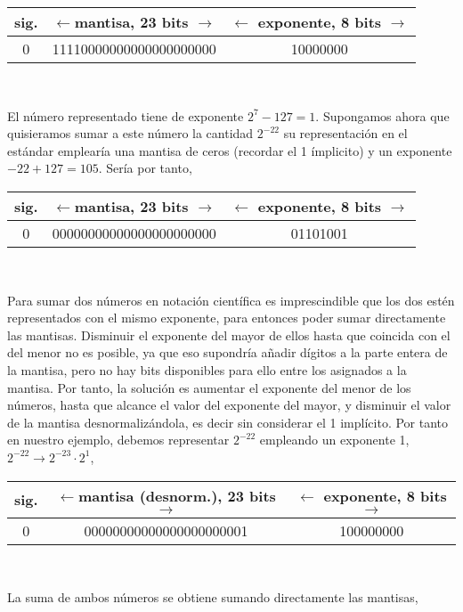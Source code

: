\begin{tabular}{|c||c||c|}
\hline
sig.&$\leftarrow$mantisa, 23 bits $\rightarrow$&$\leftarrow$ exponente, 8 bits $\rightarrow$\\
\hline
0&11110000000000000000000&10000000\\
\hline
\end{tabular}\\
\begin{paracol}{2}
El número representado tiene de exponente $2^7-127=1$. Supongamos ahora que quisieramos sumar a este número la cantidad $2^{-22}$ su representación en el estándar emplearía una mantisa de ceros (recordar el 1 ímplicito) y un exponente $-22+127=105$. Sería por tanto,
\end{paracol}
\begin{tabular}{|c||c||c|}
\hline
sig.&$\leftarrow$mantisa, 23 bits $\rightarrow$&$\leftarrow$ exponente, 8 bits $\rightarrow$\\
\hline
0&00000000000000000000000&01101001\\
\hline
\end{tabular}\\
\begin{paracol}{2}
Para sumar dos números en notación científica es imprescindible que los dos estén representados con el mismo exponente, para entonces poder sumar directamente las mantisas. Disminuir el exponente del mayor de ellos hasta que coincida con el del menor no es posible, ya que eso supondría añadir dígitos a la parte entera de la mantisa, pero no hay bits disponibles para ello entre los asignados a la mantisa. Por tanto, la solución es aumentar el exponente del menor de los números, hasta que alcance el valor del exponente del mayor, y disminuir el valor de la mantisa desnormalizándola, es decir sin considerar el 1 implícito. 
Por tanto en nuestro ejemplo, debemos representar $2^{-22}$ empleando un exponente 1, $2^{-22}\rightarrow 2^{-23}\cdot 2^1$,
\end{paracol}
\begin{tabular}{|c||c||c|}
\hline
sig.&$\leftarrow$mantisa \textbf{(desnorm.)}, 23 bits $\rightarrow$&$\leftarrow$ exponente, 8 bits $\rightarrow$\\
\hline
0&00000000000000000000001&100000000\\
\hline
\end{tabular}\\
\begin{paracol}{2}
La suma de ambos números se obtiene sumando directamente las mantisas,
\end{paracol}

